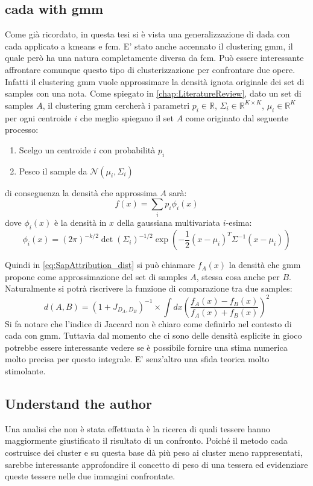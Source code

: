 \subsection{\gls{cada} with \gls{gmm}}
Come già ricordato, in questa tesi si è vista una generalizzazione di \gls{dada} con \gls{cada} applicato a \gls{kmeans} e \gls{fcm}. E' stato anche accennato il clustering \gls{gmm}, il quale però ha una natura completamente diversa da \gls{fcm}. Può essere interessante affrontare comunque questo tipo di clusterizzazione per confrontare due opere. Infatti il clustering \gls{gmm} vuole approssimare la densità ignota originale dei set di samples con una nota. Come spiegato in \cref{chap:LiteratureReview}, dato un set di samples $A$, il clustering \gls{gmm} cercherà i parametri $p_i\in \mathbb{R}$, $\Sigma_i\in\mathbb{R}^{K\times K}$, $\mu_i\in\mathbb{R}^K$ per ogni centroide $i$ che meglio spiegano il set $A$ come originato dal seguente processo:
\begin{enumerate}
	\item Scelgo un centroide $i$ con probabilità $p_i$
	\item Pesco il sample da $\mathcal{N}\left(\mu_i,\Sigma_i\right)$
\end{enumerate}
di conseguenza la densità che approssima $A$ sarà:
\[
	f(x) = \sum_i p_i\phi_i(x)
\]
dove $\phi_i(x)$ è la densità in $x$ della gaussiana multivariata $i$-esima:
\[
	\phi_i(x) = \left(2\pi\right)^{-k/2}\det\left(\Sigma_i\right)^{-1/2}\exp\left(-\frac12\left(x-\mu_i\right)^T\Sigma^{-1}\left(x-\mu_i\right)\right)
\]

Quindi in \cref{eq:SapAttribution_dist} si può chiamare $f_{A}(x)$ la densità che \gls{gmm} propone come approssimazione del set di samples $A$, stessa cosa anche per $B$. Naturalmente si potrà riscrivere la funzione di comparazione tra due samples:
\[
d(A,B)=(1+J_{D_A, D_B})^{-1} \times \int dx\left(\frac{f_A(x)-f_B(x)}{f_A(x)+f_B(x)}\right)^2
\]
Si fa notare che l'indice di Jaccard non è chiaro come definirlo nel contesto di \gls{cada} con \gls{gmm}. Tuttavia dal momento che ci sono delle densità esplicite in gioco potrebbe essere interessante vedere se è possibile fornire una stima numerica molto precisa per questo integrale. E' senz'altro una sfida teorica molto stimolante.

\subsection{Understand the author}
Una analisi che non è stata effettuata è la ricerca di quali tessere hanno maggiormente giustificato il risultato di un confronto. Poiché il metodo \gls{cada} costruisce dei cluster e su questa base dà più peso ai cluster meno rappresentati, sarebbe interessante approfondire il concetto di peso di una tessera ed evidenziare queste tessere nelle due immagini confrontate.


